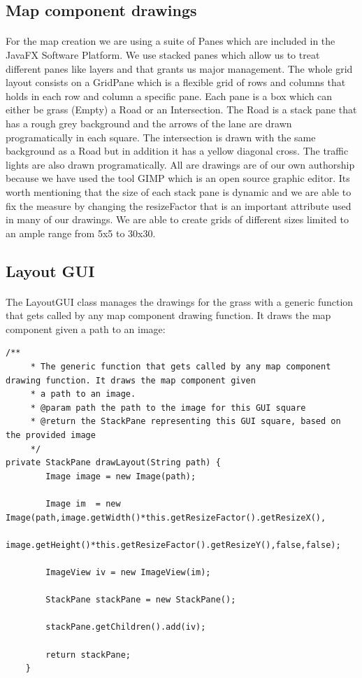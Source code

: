 \documentclass[a4paper]{article}
\begin{document}
\subsection{Map component drawings}
\paragraph{}
For the map creation we are using a suite of Panes which are included in the JavaFX Software Platform. We use stacked panes which allow us to treat different panes like layers and that grants us major management. The whole grid layout consists on a GridPane which is a flexible grid of rows and columns that holds in each row and column a specific pane. Each pane is a box which can either be grass (Empty) a Road or an Intersection. The Road is a stack pane that has a rough grey background and the arrows of the lane are drawn programatically in each square. The intersection is  drawn with the same background as a Road but in addition it has a yellow diagonal cross. The traffic lights are also drawn programatically. All are drawings are of our own authorship because we have used the tool GIMP which is an open source graphic editor. It\textsc{}s worth mentioning that the size of each stack pane is dynamic and we are able to fix the measure by changing the resizeFactor that is an important attribute used in many of our drawings. We are able to create grids of different sizes limited to an ample range from 5x5 to 30x30.
\subsection{Layout GUI}
\paragraph{}
The LayoutGUI class manages the drawings for the grass with a generic function that gets called by any map component drawing function. It draws the map component given a path to an image:
\begin{lstlisting}
/**
     * The generic function that gets called by any map component drawing function. It draws the map component given
     * a path to an image.
     * @param path the path to the image for this GUI square
     * @return the StackPane representing this GUI square, based on the provided image
     */
private StackPane drawLayout(String path) {
        Image image = new Image(path);

        Image im  = new Image(path,image.getWidth()*this.getResizeFactor().getResizeX(),
        image.getHeight()*this.getResizeFactor().getResizeY(),false,false);

        ImageView iv = new ImageView(im);

        StackPane stackPane = new StackPane();

        stackPane.getChildren().add(iv);

        return stackPane;
    }
\end{lstlisting}
\end{document}
